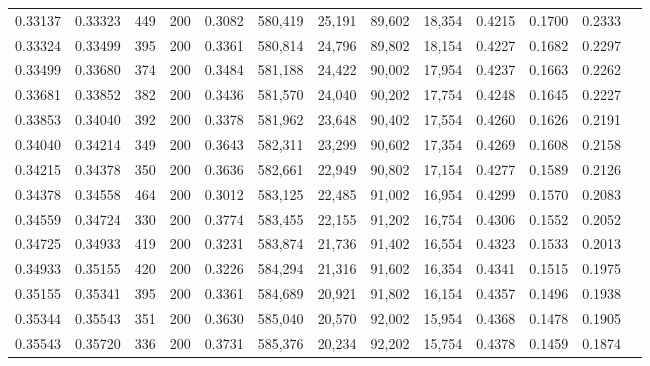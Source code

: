 \begin{tabular}{rrrrrrrrrrrrr}
0.33137 & 0.33323 &   449 & 200 &                                     0.3082 & 580,419 &  25,191 &  89,602 &  18,354 & 0.4215 & 0.1700 & 0.2333 \\
0.33324 & 0.33499 &   395 & 200 &                                     0.3361 & 580,814 &  24,796 &  89,802 &  18,154 & 0.4227 & 0.1682 & 0.2297 \\
0.33499 & 0.33680 &   374 & 200 &                                     0.3484 & 581,188 &  24,422 &  90,002 &  17,954 & 0.4237 & 0.1663 & 0.2262 \\
0.33681 & 0.33852 &   382 & 200 &                                     0.3436 & 581,570 &  24,040 &  90,202 &  17,754 & 0.4248 & 0.1645 & 0.2227 \\
0.33853 & 0.34040 &   392 & 200 &                                     0.3378 & 581,962 &  23,648 &  90,402 &  17,554 & 0.4260 & 0.1626 & 0.2191 \\
0.34040 & 0.34214 &   349 & 200 &                                     0.3643 & 582,311 &  23,299 &  90,602 &  17,354 & 0.4269 & 0.1608 & 0.2158 \\
0.34215 & 0.34378 &   350 & 200 &                                     0.3636 & 582,661 &  22,949 &  90,802 &  17,154 & 0.4277 & 0.1589 & 0.2126 \\
0.34378 & 0.34558 &   464 & 200 &                                     0.3012 & 583,125 &  22,485 &  91,002 &  16,954 & 0.4299 & 0.1570 & 0.2083 \\
0.34559 & 0.34724 &   330 & 200 &                                     0.3774 & 583,455 &  22,155 &  91,202 &  16,754 & 0.4306 & 0.1552 & 0.2052 \\
0.34725 & 0.34933 &   419 & 200 &                                     0.3231 & 583,874 &  21,736 &  91,402 &  16,554 & 0.4323 & 0.1533 & 0.2013 \\
0.34933 & 0.35155 &   420 & 200 &                                     0.3226 & 584,294 &  21,316 &  91,602 &  16,354 & 0.4341 & 0.1515 & 0.1975 \\
0.35155 & 0.35341 &   395 & 200 &                                     0.3361 & 584,689 &  20,921 &  91,802 &  16,154 & 0.4357 & 0.1496 & 0.1938 \\
0.35344 & 0.35543 &   351 & 200 &                                     0.3630 & 585,040 &  20,570 &  92,002 &  15,954 & 0.4368 & 0.1478 & 0.1905 \\
0.35543 & 0.35720 &   336 & 200 &                                     0.3731 & 585,376 &  20,234 &  92,202 &  15,754 & 0.4378 & 0.1459 & 0.1874 \\

\end{tabular}
